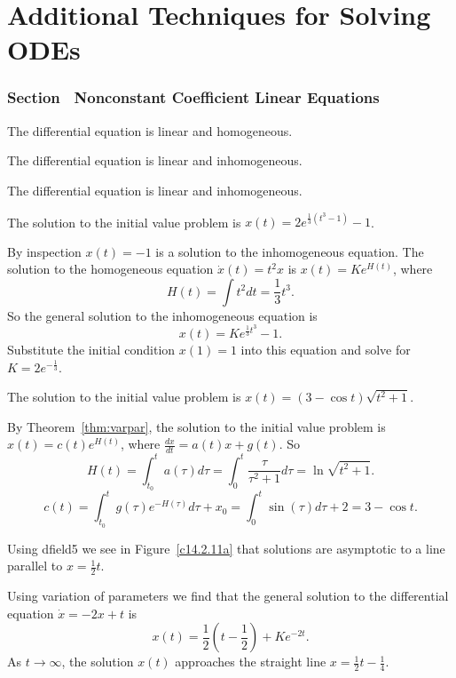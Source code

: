 \chapter{Additional Techniques for Solving ODEs}

\subsection*{Section~\protect{\ref{sec:VarConstS}} Nonconstant Coefficient
Linear Equations}

 The differential equation is linear and homogeneous.

 The differential equation is linear and inhomogeneous.

 The differential equation is linear and inhomogeneous.

 \ans The solution to the initial value problem is
$x(t) = 2e^{\frac{1}{3}(t^3 - 1)} - 1$.

\soln By inspection $x(t) = -1$ is a solution to the inhomogeneous
equation.  The solution to the homogeneous equation $\dot{x}(t) = t^2x$ is
$x(t) = Ke^{H(t)}$, where
\[
H(t) = \int t^2dt = \frac{1}{3}t^3.
\]
So the general solution to the inhomogeneous equation is
\[
x(t) = Ke^{\frac{1}{3}t^3} - 1.
\]
Substitute the initial condition $x(1) = 1$ into this equation and
solve for $K = 2e^{-\frac{1}{3}}$.

 \ans The solution to the initial value problem is
$x(t) = (3 - \cos t)\sqrt{t^2 + 1}$.

\soln By Theorem~\ref{thm:varpar}, the
solution to the initial value problem is $x(t) = c(t)e^{H(t)}$, where
$\frac{dx}{dt} = a(t)x + g(t)$.  So
\[
H(t) = \int_{t_0}^t a(\tau)d\tau = \int_0^t\frac{\tau}{\tau^2 + 1}d\tau
= \ln\sqrt{t^2 + 1}.
\]
\[
c(t) = \int_{t_0}^t g(\tau)e^{-H(\tau)}d\tau + x_0
= \int_0^t \sin(\tau)d\tau + 2
= 3 - \cos t.
\]

 Using {\sf dfield5} we see in Figure~\ref{c14.2.11a} that
solutions are asymptotic to a line parallel to $x=\frac{1}{2}t$.

\begin{figure}[htb]
     \centerline{%
     }
\end{figure} 
Using variation of parameters we find that the general solution to the
differential equation $\dot{x}=-2x+t$ is 
\[
x(t) = \frac{1}{2}\left(t-\frac{1}{2}\right) +Ke^{-2t}.
\]
As $t\to\infty$, the solution $x(t)$ approaches the straight line 
$x= \frac{1}{2}t-\frac{1}{4}$.

